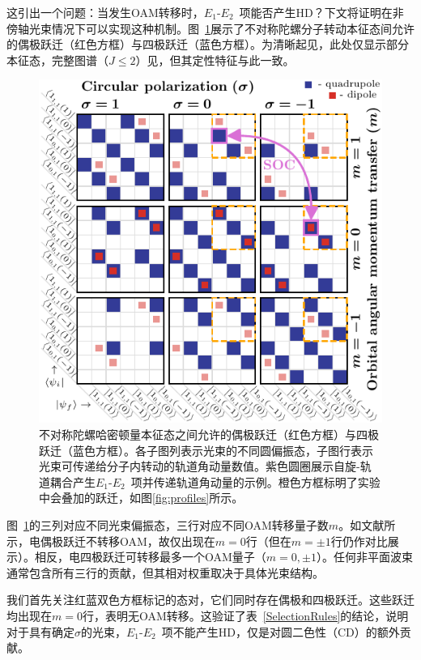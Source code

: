 \documentclass[reprint,aps,prl,twocolumn,superscriptaddress,groupedaddress]{revtex4-2}
\newcommand{\eoet}{$E_1$-$E_2$}
\begin{document}
\begin{CJK*}{UTF8}{gbsn}
这引出一个问题：当发生OAM转移时，\eoet~项能否产生HD？下文将证明在非傍轴光束情况下可以实现这种机制。图~\ref{fig:gridJ1}展示了不对称陀螺分子转动本征态间允许的偶极跃迁（红色方框）与四极跃迁（蓝色方框）。为清晰起见，此处仅显示部分本征态，完整图谱（$J\leq 2$）见\cite{Note1}，但其定性特征与此一致。

\begin{figure}[ht!]
    \centering
    \includegraphics[width=\linewidth]{Figure1.pdf}
    \caption{不对称陀螺哈密顿量本征态之间允许的偶极跃迁（红色方框）与四极跃迁（蓝色方框）。各子图列表示光束的不同圆偏振态，子图行表示光束可传递给分子内转动的轨道角动量数值。紫色圆圈展示自旋-轨道耦合产生\eoet~项并传递轨道角动量的示例。橙色方框标明了实验中会叠加的跃迁，如图\ref{fig:profiles}所示。}
    \label{fig:gridJ1}
\end{figure}
图~\ref{fig:gridJ1}的三列对应不同光束偏振态，三行对应不同OAM转移量子数$m$。如文献\cite{Maslov2024,Maslov_Thesis}所示，电偶极跃迁不转移OAM，故仅出现在$m=0$行（但在$m=\pm 1$行仍作对比展示）。相反，电四极跃迁可转移最多一个OAM量子（$m=0,\pm 1$）。任何非平面波束通常包含所有三行的贡献，但其相对权重取决于具体光束结构。

我们首先关注红蓝双色方框标记的态对，它们同时存在偶极和四极跃迁。这些跃迁均出现在$m=0$行，表明无OAM转移。这验证了表~\ref{SelectionRules}的结论，说明对于具有确定$\sigma$的光束，\eoet~项不能产生HD，仅是对圆二色性（CD）的额外贡献。


\end{CJK*}
\end{document}
